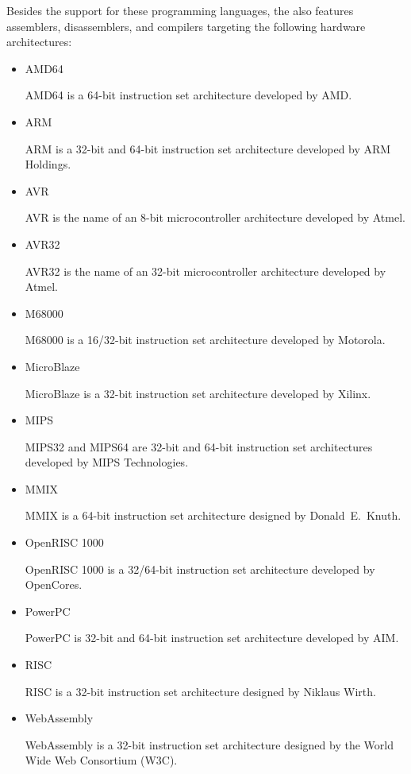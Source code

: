 Besides the support for these programming languages, the \ecs{} also features assemblers, disassemblers, and compilers targeting the following hardware architectures:

\begin{itemize}

\item AMD64\nopagebreak

AMD64 is a 64-bit instruction set architecture developed by AMD\@.
\seeamd

\item ARM\nopagebreak

ARM is a 32-bit and 64-bit instruction set architecture developed by ARM Holdings.
\seearm

\item AVR\nopagebreak

AVR is the name of an 8-bit microcontroller architecture developed by Atmel.
\seeavr

\item AVR32\nopagebreak

AVR32 is the name of an 32-bit microcontroller architecture developed by Atmel.
\seeavrtt

\item M68000\nopagebreak

M68000 is a 16/32-bit instruction set architecture developed by Motorola.
\seemabk

\item MicroBlaze\nopagebreak

MicroBlaze is a 32-bit instruction set architecture developed by Xilinx.
\seemibl

\item MIPS\nopagebreak

MIPS32 and MIPS64 are 32-bit and 64-bit instruction set architectures developed by MIPS Technologies.
\seemips

\item MMIX\nopagebreak

MMIX is a 64-bit instruction set architecture designed by Donald~E.\ Knuth.
\seemmix

\item OpenRISC 1000\nopagebreak

OpenRISC 1000 is a 32/64-bit instruction set architecture developed by OpenCores.
\seeorok

\item PowerPC\nopagebreak

PowerPC is 32-bit and 64-bit instruction set architecture developed by AIM\@.
\seeppc

\item RISC\nopagebreak

RISC is a 32-bit instruction set architecture designed by Niklaus Wirth.
\seerisc

\item WebAssembly\nopagebreak

WebAssembly is a 32-bit instruction set architecture designed by the World Wide Web Consortium (W3C).
\seewasm

\end{itemize}

